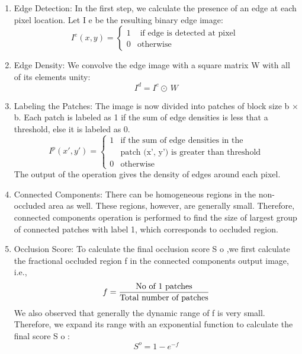 \documentclass{sig-alternate}
\begin{document}
\begin{enumerate}
    \item Edge Detection: In the first step, we calculate the presence of an edge at each pixel location. Let I e be the resulting binary edge image:
    \begin{equation}
    I^{e}(x,y)=
    \begin{cases}
      1 & \text{ if edge is detected at pixel }\\
      0 & \text{otherwise}
    \end{cases}
    \end{equation}
    \item Edge Density: We convolve the edge image with a square matrix W with all of its elements unity:
    \begin{equation}
    I^{d} = I^{e} \odot\ \textit{W}
    \end{equation}
    \item Labeling the Patches: The image is now divided into patches of block size b × b. Each patch is labeled as 1 if the sum of edge densities is less that a threshold, else it is labeled as 0.
    \begin{equation}
    I^{p}(x',y')=
    \begin{cases}
      1 & \text{if the sum of edge densities in the}\\ & \text{patch (x', y') is greater than threshold}\\0 & \text{otherwise}
    \end{cases}
    \end{equation}
    The output of the operation gives the density of edges around each pixel.
    \item Connected Components: There can be homogeneous regions in the non-occluded area as well. These regions, however, are generally small. Therefore, connected components operation is performed to find the size of largest group of connected patches with label 1, which corresponds to occluded region.
    \item Occlusion Score: To calculate the final occlusion score S o ,we first calculate the fractional occluded region f in the connected components output image, i.e.,
    \begin{equation}
    f = \frac{\textnormal{No\ of\ 1\ patches}}{\textnormal{Total\ number\ of\ patches}}
\end{equation}
We also observed that generally the dynamic range of f is very small. Therefore, we expand its range with an exponential function to calculate the final score S o :
\begin{equation}
S^{o} = 1 - e^{-f}
\end{equation}
\end{enumerate}
\end{document}
